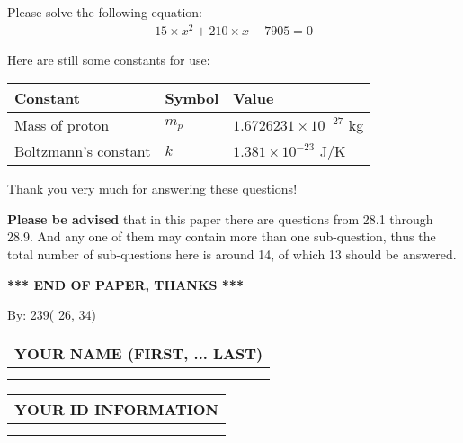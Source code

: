 \documentclass[12pt]{article}
\begin{document}
  
 
 

 
Please solve the following equation:
\begin{eqnarray*}
15 \times x^2  %
+  %
210
                 \times x    %
-7905 =0
\end{eqnarray*}
 

 

 
\vspace{0.3in}
   
   
 \vspace{0.2in}
Here are still some constants for use:
 
 
\noindent\begin{tabular}{|l|l|l|}
\hline
Constant & Symbol & Value \\
\hline
 
Mass of proton &
$m_p$ &
 $ 1.6726231 \times 10^{-27} $
kg \\
\hline
 
Boltzmann's constant &
$k$ &
 $ 1.381 \times 10^{-23} $
J/K \\
\hline
 
\end{tabular}
 
Thank you very much for answering these questions!
 
{\textbf{\large{Please be advised}}} that in this paper there are questions from
28.1 through
28.9.
And any one of them may contain more than one sub-question, thus the total number
of sub-questions here is around 14, of which
13 should be answered.
 
   
   
   
   
\vspace{1.0in} 
{\textbf{\large{ *** END OF PAPER, THANKS *** }}} 
   
   
\hspace{1.0in} By: 
         239(         26,          34)
   
   
   
   
\newpage 
\setcounter{page}{ 
    29001 } 
   
   
   
   
\noindent\begin{tabular}{|l|}
\hline
YOUR NAME (FIRST, ... LAST)  \\
\hline
 \\ 
 \\ 
\hline
\end{tabular}
\hspace{0.05in} \begin{tabular}{|l|}
\hline
 YOUR   ID   INFORMATION  \\
\hline
 \\ 
 \\ 
\hline
\end{tabular}
   
\end{document}
